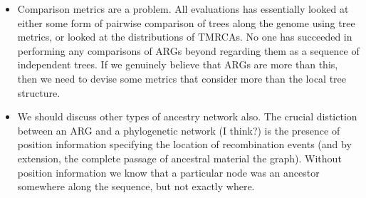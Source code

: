 \documentclass{article}
\begin{document}
\begin{itemize}
\item Comparison metrics are a problem. All evaluations has essentially
looked at either some form of pairwise comparison of trees along the genome
using tree metrics, or looked at the distributions of TMRCAs. No
one has succeeded in performing any comparisons of ARGs beyond
regarding them as a sequence of independent trees. If we genuinely believe
that ARGs are more than this, then we need to devise some metrics that
consider more than the local tree structure.

\item We should discuss other types of ancestry network also.
The crucial distiction between an ARG and a phylogenetic network (I think?) is
the presence of position information specifying the location of
recombination events (and by extension, the complete passage
of ancestral material the graph). Without position information
we know that a particular node was an ancestor somewhere along the
sequence, but not exactly where.

\end{itemize}



\end{document}
